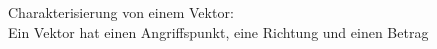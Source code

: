 \newcommand{\titleinfo}{Physik 1 - Zusammenfassung}
\newcommand{\authorinfo}{C. v./d.G.}
\newcommand{\versioninfo}{$Rev: 1.0 $ | 
						gem\"ass Unterricht HS2017}

%


\usepackage{tikz}








Charakterisierung von einem Vektor: \\
Ein Vektor hat einen Angriffspunkt, eine Richtung und einen Betrag 




